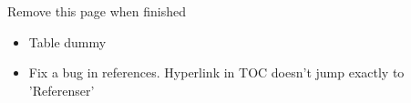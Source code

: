 \listoftodos
 Remove this page when finished
\begin{itemize}
    \item Table dummy
    \item Fix a bug in references. Hyperlink in TOC doesn't jump exactly to 'Referenser'
\end{itemize}

\newpage